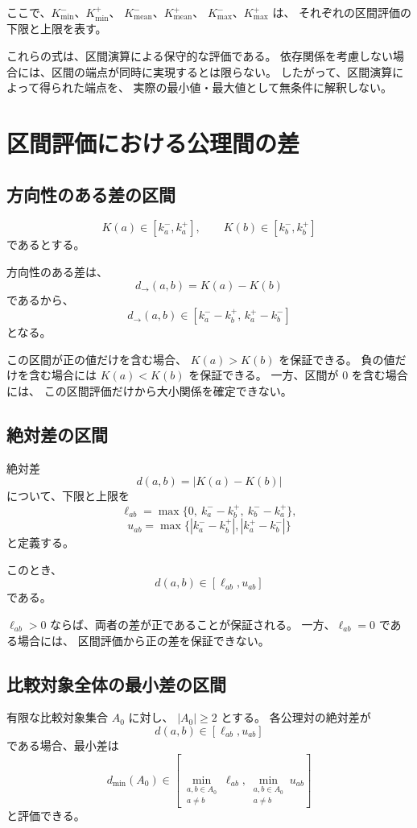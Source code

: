 \documentclass[a4paper,12pt]{article}
\begin{document}
ここで、$K_{\min}^-$、$K_{\min}^+$、
$K_{\mathrm{mean}}^-$、$K_{\mathrm{mean}}^+$、
$K_{\max}^-$、$K_{\max}^+$ は、
それぞれの区間評価の下限と上限を表す。

これらの式は、区間演算による保守的な評価である。
依存関係を考慮しない場合には、区間の端点が同時に実現するとは限らない。
したがって、区間演算によって得られた端点を、
実際の最小値・最大値として無条件に解釈しない。

\section{区間評価における公理間の差}

\subsection{方向性のある差の区間}

\[
    K(a)\in[k_a^-,k_a^+],
    \qquad
    K(b)\in[k_b^-,k_b^+]
\]
であるとする。

方向性のある差は、
\[
    d_{\to}(a,b)=K(a)-K(b)
\]
であるから、
\[
    d_{\to}(a,b)
    \in
    [k_a^--k_b^+,\,k_a^+-k_b^-]
\]
となる。

この区間が正の値だけを含む場合、
$K(a)>K(b)$ を保証できる。
負の値だけを含む場合には $K(a)<K(b)$ を保証できる。
一方、区間が $0$ を含む場合には、
この区間評価だけから大小関係を確定できない。

\subsection{絶対差の区間}

絶対差
\[
    d(a,b)=|K(a)-K(b)|
\]
について、下限と上限を
\[
    \ell_{ab}
    =
    \max\{0,\ k_a^--k_b^+,\ k_b^--k_a^+\},
\]
\[
    u_{ab}
    =
    \max\{
        |k_a^--k_b^+|,
        |k_a^+-k_b^-|
    \}
\]
と定義する。

このとき、
\[
    d(a,b)\in[\ell_{ab},u_{ab}]
\]
である。

$\ell_{ab}>0$ ならば、両者の差が正であることが保証される。
一方、$\ell_{ab}=0$ である場合には、
区間評価から正の差を保証できない。

\subsection{比較対象全体の最小差の区間}

有限な比較対象集合 $A_0$ に対し、
$|A_0|\geq2$ とする。
各公理対の絶対差が
\[
    d(a,b)\in[\ell_{ab},u_{ab}]
\]
である場合、最小差は
\[
    d_{\min}(A_0)
    \in
    \left[
        \min_{\substack{a,b\in A_0\\a\ne b}}\ell_{ab},
        \min_{\substack{a,b\in A_0\\a\ne b}}u_{ab}
    \right]
\]
と評価できる。
\end{document}
